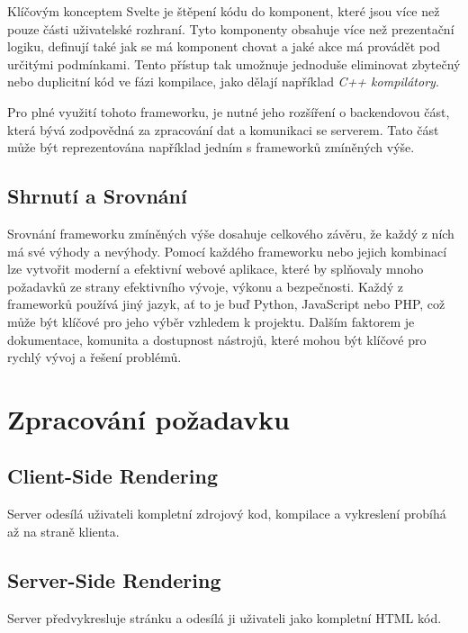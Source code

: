 Klíčovým konceptem Svelte je štěpení kódu do komponent, které jsou více než pouze části uživatelské rozhraní. Tyto komponenty obsahuje více než prezentační logiku, definují také jak se má komponent chovat a jaké akce má provádět pod určitými podmínkami. Tento přístup tak umožnuje jednoduše eliminovat zbytečný nebo duplicitní kód ve fázi kompilace, jako dělají například \textit{C++ kompilátory}.

Pro plné využití tohoto frameworku, je nutné jeho rozšíření o backendovou část, která bývá zodpovědná za zpracování dat a komunikaci se serverem. Tato část může být reprezentována například jedním s frameworků zmíněných výše. \cite{about_svelte}

\subsection{Shrnutí a Srovnání}
\label{subsec:dev-framework-comparison}
Srovnání frameworku zmíněných výše dosahuje celkového závěru, že každý z ních má své výhody a nevýhody. Pomocí každého frameworku nebo jejich kombinací lze vytvořit moderní a efektivní webové aplikace, které by splňovaly mnoho požadavků ze strany efektivního vývoje, výkonu a bezpečnosti.
Každý z frameworků používá jiný jazyk, ať to je buď Python, JavaScript nebo PHP, což může být klíčové pro jeho výběr vzhledem k projektu. Dalším faktorem je dokumentace, komunita a dostupnost nástrojů, které mohou být klíčové pro rychlý vývoj a řešení problémů.


\section{Zpracování požadavku}
\label{sec:dev-request-processing}


\subsection{Client-Side Rendering}
\label{subsec:dev-request-processing-client-side-rendering}
Server odesílá uživateli kompletní zdrojový kod, kompilace a vykreslení probíhá až na straně klienta.

\subsection{Server-Side Rendering}
\label{subsec:dev-request-processing-server-side-rendering}
Server předvykresluje stránku a odesílá ji uživateli jako kompletní HTML kód.

